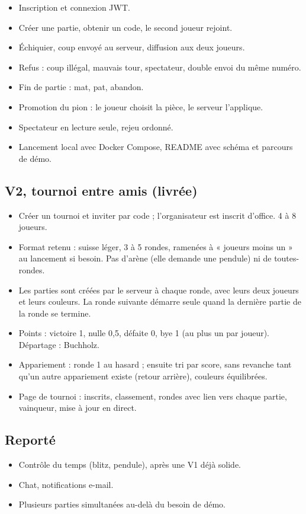 \documentclass[11pt,a4paper]{article}
\begin{document}
\begin{itemize}
  \item Inscription et connexion JWT.
  \item Créer une partie, obtenir un code, le second joueur rejoint.
  \item Échiquier, coup envoyé au serveur, diffusion aux deux joueurs.
  \item Refus : coup illégal, mauvais tour, spectateur, double envoi du même numéro.
  \item Fin de partie : mat, pat, abandon.
  \item Promotion du pion : le joueur choisit la pièce, le serveur l'applique.
  \item Spectateur en lecture seule, rejeu ordonné.
  \item Lancement local avec Docker Compose, README avec schéma et parcours de démo.
\end{itemize}

\subsection{V2, tournoi entre amis (livrée)}

\begin{itemize}
  \item Créer un tournoi et inviter par code ; l'organisateur est inscrit d'office. 4 à 8 joueurs.
  \item Format retenu : suisse léger, 3 à 5 rondes, ramenées à « joueurs moins un » au lancement si besoin. Pas d'arène (elle demande une pendule) ni de toutes-rondes.
  \item Les parties sont créées par le serveur à chaque ronde, avec leurs deux joueurs et leurs couleurs. La ronde suivante démarre seule quand la dernière partie de la ronde se termine.
  \item Points : victoire 1, nulle 0,5, défaite 0, bye 1 (au plus un par joueur). Départage : Buchholz.
  \item Appariement : ronde 1 au hasard ; ensuite tri par score, sans revanche tant qu'un autre appariement existe (retour arrière), couleurs équilibrées.
  \item Page de tournoi : inscrits, classement, rondes avec lien vers chaque partie, vainqueur, mise à jour en direct.
\end{itemize}

\subsection{Reporté}
\begin{itemize}
  \item Contrôle du temps (blitz, pendule), après une V1 déjà solide.
  \item Chat, notifications e-mail.
  \item Plusieurs parties simultanées au-delà du besoin de démo.
\end{itemize}
\end{document}
